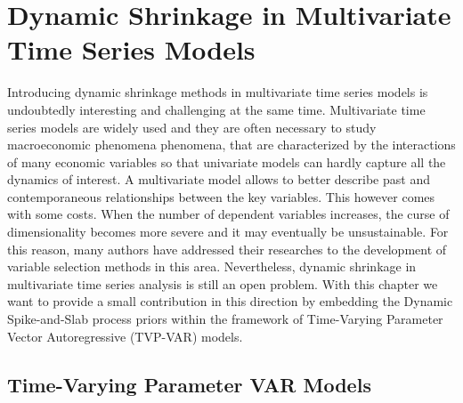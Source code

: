 \documentclass[
  12pt,
]{book}
\theoremstyle{break}
\theoremstyle{nonumberplain}
\begin{document}
\chapter[Multivariate Time Series Models]{Dynamic Shrinkage in Multivariate Time Series Models}\label{Dynamic Shrinkage in Multivariate Time Series Models}

Introducing dynamic shrinkage methods in multivariate time series models
is undoubtedly interesting and challenging at the same time.
Multivariate time series models are widely used and they are often
necessary to study macroeconomic phenomena phenomena, that are
characterized by the interactions of many economic variables so that
univariate models can hardly capture all the dynamics of interest. A
multivariate model allows to better describe past and contemporaneous
relationships between the key variables. This however comes with some
costs. When the number of dependent variables increases, the curse of
dimensionality becomes more severe and it may eventually be
unsustainable. For this reason, many authors have addressed their
researches to the development of variable selection methods in this
area. Nevertheless, dynamic shrinkage in multivariate time series
analysis is still an open problem. With this chapter we want to provide
a small contribution in this direction by embedding the Dynamic
Spike-and-Slab process priors within the framework of Time-Varying
Parameter Vector Autoregressive (TVP-VAR) models.

\section{Time-Varying Parameter VAR Models}
\end{document}
